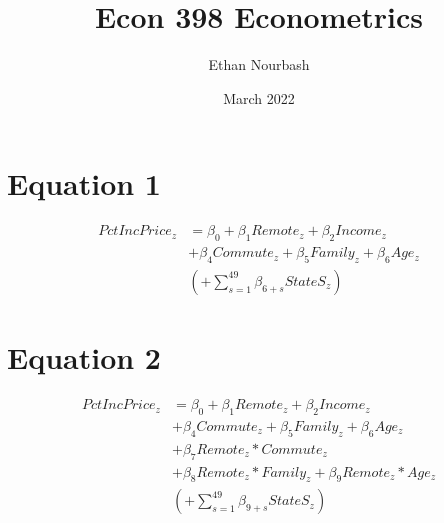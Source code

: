 \documentclass{article}
\title{Econ 398 Econometrics}
\author{Ethan Nourbash}
\date{March 2022}
\begin{document}
\maketitle

\section{Equation 1}
\begin{equation}
    \begin{aligned}
    PctIncPrice_z & = \beta_0 + \beta_1 Remote_z + \beta_2 Income_z \\
                   & + \beta_4 Commute_z + \beta_5 Family_z + \beta_6 Age_z \\
                   & (+ \sum_{s=1}^{49}\beta_{6+s}StateS_z)
    \end{aligned}
\end{equation}
\section{Equation 2}
\begin{equation}
    \begin{aligned}
    PctIncPrice_z & = \beta_0 + \beta_1 Remote_z + \beta_2 Income_z \\
                   & + \beta_4 Commute_z + \beta_5 Family_z + \beta_6 Age_z \\
                   & + \beta_7 Remote_z*Commute_z \\
                   & + \beta_8 Remote_z*Family_z + \beta_9 Remote_z*Age_z \\
                   & (+\sum_{s=1}^{49}\beta_{9+s}StateS_z)
    \end{aligned}
\end{equation}
\end{document}

